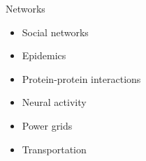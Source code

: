 \documentclass[10pt,titlepage,english,presentation]{beamer}
\begin{document}
\begin{frame}{Networks}
\begin{minipage}[t]{.33\textwidth}
\begin{itemize}
    \small
    \item Social networks
    \item Epidemics
\end{itemize}
\end{minipage}\hfill
\begin{minipage}[t]{.33\textwidth}
\begin{itemize}
    \small
    \item Protein-protein interactions
    \item Neural activity
\end{itemize}
\end{minipage}\hfill
\begin{minipage}[t]{.33\textwidth}
\begin{itemize}
    \small
    \item Power grids
    \item Transportation
\end{itemize}
\end{minipage}
\end{frame}
\end{document}

